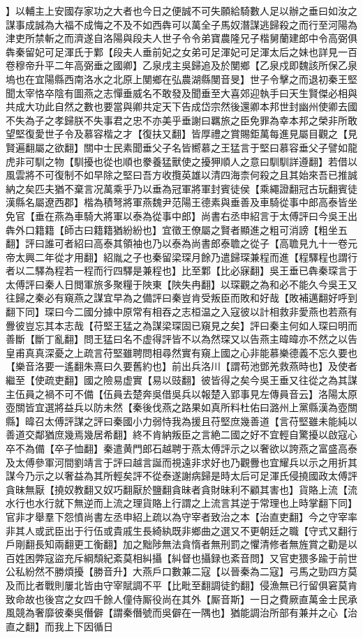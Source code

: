 】以輔主上安國存家功之大者也今日之便誠不可失願給騎數人足以辦之垂曰如汝之謀事成誠為大福不成悔之不及不如西犇可以萬全子馬奴潛謀逃歸殺之而行至河陽為津吏所禁斬之而濟遂自洛陽與段夫人世子令令弟寶農隆兄子楷舅蘭建郎中令高弼俱犇秦留妃可足渾氏于鄴【段夫人垂前妃之女弟可足渾妃可足渾太后之妹也詳見一百卷穆帝升平二年高弼垂之國卿】乙泉戌主吳歸追及於閺鄉【乙泉戍即魏該所保乙泉塢也在宜陽縣西南洛水之北原上閺鄉在弘農湖縣閺音旻】世子令擊之而退初秦王堅聞太宰恪卒陰有圖燕之志憚垂威名不敢發及聞垂至大喜郊迎執手曰天生賢傑必相與共成大功此自然之數也要當與卿共定天下告成岱宗然後還卿本邦世封幽州使卿去國不失為子之孝歸朕不失事君之忠不亦美乎垂謝曰羈旅之臣免罪為幸本邦之榮非所敢望堅復愛世子令及慕容楷之才【復扶又翻】皆厚禮之賞賜鉅萬每進見屬目觀之【見賢遍翻屬之欲翻】關中士民素聞垂父子名皆嚮慕之王猛言于堅曰慕容垂父子譬如龍虎非可馴之物【馴擾也從也順也豢養猛獸使之擾狎順人之意曰馴馴詳遵翻】若借以風雲將不可復制不如早除之堅曰吾方收攬英雄以清四海柰何殺之且其始來吾已推誠納之矣匹夫猶不棄言况萬乘乎乃以垂為冠軍將軍封賓徒侯【乘繩證翻冠古玩翻賓徒漢縣名屬遼西郡】楷為積弩將軍燕魏尹范陽王德素與垂善及車騎從事中郎高泰皆坐免官【垂在燕為車騎大將軍以泰為從事中郎】尚書右丞申紹言于太傅評曰今吳王出犇外口籍籍【師古曰籍籍猶紛紛也】宜徵王僚屬之賢者顯進之粗可消謗【粗坐五翻】評曰誰可者紹曰高泰其領袖也乃以泰為尚書郎泰聸之從子【高聸見九十一卷元帝太興二年從才用翻】紹胤之子也秦留梁琛月餘乃遣歸琛兼程而進【程驛程也謂行者以二驛為程若一程而行四驛是兼程也】比至鄴【比必寐翻】吳王垂已犇秦琛言于太傅評曰秦人日閲軍旅多聚糧于陜東【陜失冉翻】以琛觀之為和必不能久今吳王又往歸之秦必有窺燕之謀宜早為之備評曰秦豈肯受叛臣而敗和好哉【敗補邁翻好呼到翻下同】琛曰今二國分據中原常有相吞之志桓温之入寇彼以計相救非愛燕也若燕有釁彼豈忘其本志哉【苻堅王猛之為謀梁琛固已窺見之矣】評曰秦主何如人琛曰明而善斷【斷丁亂翻】問王猛曰名不虚得評皆不以為然琛又以告燕主暐暐亦不然之以告皇甫真真深憂之上疏言苻堅雖聘問相尋然實有窺上國之心非能慕樂德義不忘久要也【樂音洛要一遙翻朱熹曰久要舊約也】前出兵洛川【謂苟池鄧羌救燕時也】及使者繼至【使疏吏翻】國之險易虚實【易以豉翻】彼皆得之矣今吳王垂又往從之為其謀主伍員之禍不可不備【伍員去楚奔吳借吳兵以報楚入郢事見左傳員音云】洛陽太原壺關皆宜選將益兵以防未然【秦後伐燕之路果如真所料杜佑曰潞州上黨縣漢為壺關縣】暐召太傅評謀之評曰秦國小力弱恃我為援且苻堅庶幾善道【言苻堅雖未能純以善道交鄰猶庶幾焉幾居希翻】終不肯納叛臣之言絶二國之好不宜輕自驚擾以啟寇心卒不為備【卒子恤翻】秦遣黄門郎石越聘于燕太傅評示之以奢欲以誇燕之富盛高泰及太傅參軍河間劉靖言于評曰越言誕而視遠非求好也乃觀釁也宜耀兵以示之用折其謀今乃示之以奢益為其所輕矣評不從泰遂謝病歸是時太后可足渾氏侵撓國政太傅評貪昧無厭【撓奴教翻又奴巧翻厭於鹽翻貪昧者貪財昧利不顧其害也】貨賂上流【流水行也水行就下無逆而上流之理貨賂上行謂之上流言其逆于常理也上時掌翻下同】官非才舉羣下怨憤尚書左丞申紹上疏以為守宰者致治之本【治直吏翻】今之守宰率非其人或武臣出于行伍或貴戚生長綺紈既非鄉曲之選又不更朝廷之職【守式又翻行戶剛翻長知兩翻更工衡翻】加之黜陟無法貪惰者無刑罰之懼清修者無旌賞之勸是以百姓困弊寇盜充斥綱頹紀紊莫相糾攝【糾督也攝録也紊音問】又官吏猥多踰于前世公私紛然不勝煩擾【勝音升】大燕戶口數兼二寇【以晉秦為二寇】弓馬之勁四方莫及而比者戰則屢北皆由守宰賦調不平【比毗至翻調徒釣翻】侵漁無已行留俱窘莫肯致命故也後宫之女四千餘人僮侍厮役尚在其外【厮音斯】一日之費厥直萬金士民承風競為奢靡彼秦吳僭僻【謂秦僭號而吳僻在一隅也】猶能調治所部有兼并之心【治直之翻】而我上下因循日